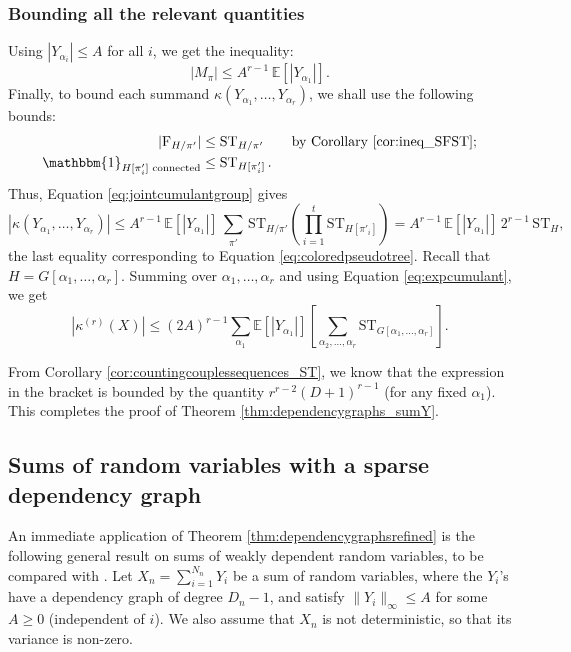 \documentclass[12pt,a4paper,reqno]{amsart}
\theoremstyle{remark}
\newcommand{\ST}{\mathrm{ST}}
\newcommand{\SF}{\mathrm{F}}
\newcommand{\esper}{\mathbb{E}}
\begin{document}
\subsubsection{Bounding all the relevant quantities}
Using $|Y_{\alpha_i}| \le A$ for all $i$, we get the inequality: 
$$|M_\pi| \le A^{r-1}\, \esper[|Y_{\alpha_1}|].$$
Finally, to bound each summand $\kappa(Y_{\alpha_1},\dots,Y_{\alpha_r})$, we shall use the following bounds:
\begin{align*}
    |\SF_{H/\pi'}| &\le \ST_{H/\pi'}  \qquad \text{by Corollary \ref{cor:ineq_SFST};}\\
    \mathbbm{1}_{H[\pi'_i]\text{ connected}} &\le \ST_{H[\pi'_i]}\,.
\end{align*}
Thus, Equation \eqref{eq:jointcumulantgroup} gives
\begin{equation}\label{eq:boundkappa}
    |\kappa(Y_{\alpha_1},\dots, Y_{\alpha_r})| \le 
    A^{r-1}\, \esper [|Y_{\alpha_1}|]
    \,\sum_{\pi'} \,\ST_{H/\pi'} \left(\prod_{i=1}^t \ST_{H[\pi'_i]}\right) =
    A^{r-1}\, \esper[|Y_{\alpha_1}|]
    \, 2^{r-1}\, \ST_H,
\end{equation}
the last equality corresponding to Equation \eqref{eq:coloredpseudotree}.
Recall that $H=G[\alpha_1,\dots,\alpha_r]$.
Summing over $\alpha_1,\dots,\alpha_r$ and using Equation \eqref{eq:expcumulant}, we get 
$$
|\kappa^{(r)}(X)| \le (2A)^{r-1} \sum_{\alpha_1} \esper[|Y_{\alpha_1}|] \left[ \sum_{\alpha_2,\dots,\alpha_r} \ST_{G[\alpha_1,\dots,\alpha_r]} \right].
$$

\noindent From Corollary \ref{cor:countingcouplessequences_ST}, we know that the expression in the bracket is bounded by the quantity \hbox{$r^{r-2} (D+1)^{r-1}$} (for any fixed $\alpha_1$). This completes the proof of Theorem \ref{thm:dependencygraphs_sumY}.
\bigskip



\subsection{Sums of random variables with a sparse dependency graph}
An immediate application of Theorem \ref{thm:dependencygraphsrefined} is the following general result on sums of weakly dependent random variables, to be compared with \cite[\S2.3]{Pen02}. Let $X_n=\sum_{i=1}^{N_n} Y_i$ be a sum of random variables, where the $Y_i$'s have a dependency graph of degree $D_n-1$, and satisfy $\|Y_i\|_\infty \leq A$ for some $A \geq 0$ (independent of $i$). We also assume that $X_n$ is not deterministic, so that its variance is non-zero.
\end{document}
